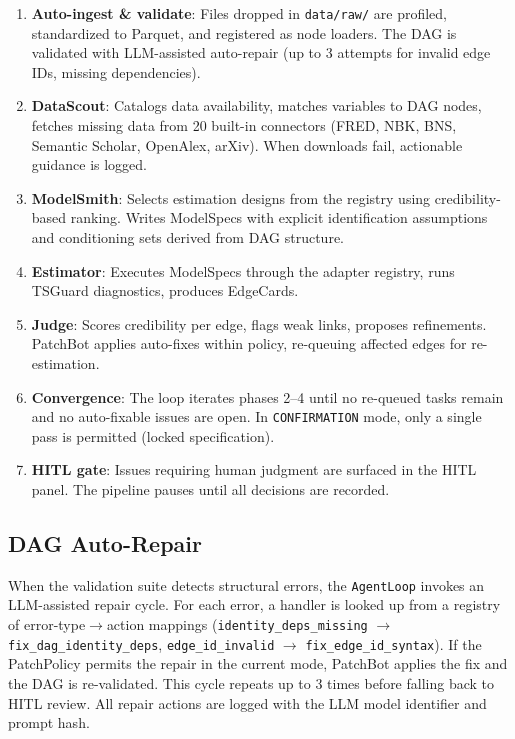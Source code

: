 \documentclass{article}
\begin{document}
\begin{enumerate}[leftmargin=*, itemsep=1pt]
    \item[\textbf{0.}] \textbf{Auto-ingest \& validate}: Files dropped in \texttt{data/raw/} are profiled, standardized to Parquet, and registered as node loaders. The DAG is validated with LLM-assisted auto-repair (up to 3 attempts for invalid edge IDs, missing dependencies).

    \item[\textbf{1.}] \textbf{DataScout}: Catalogs data availability, matches variables to DAG nodes, fetches missing data from 20 built-in connectors (FRED, NBK, BNS, Semantic Scholar, OpenAlex, arXiv). When downloads fail, actionable guidance is logged.

    \item[\textbf{2.}] \textbf{ModelSmith}: Selects estimation designs from the registry using credibility-based ranking. Writes ModelSpecs with explicit identification assumptions and conditioning sets derived from DAG structure.

    \item[\textbf{3.}] \textbf{Estimator}: Executes ModelSpecs through the adapter registry, runs TSGuard diagnostics, produces EdgeCards.

    \item[\textbf{4.}] \textbf{Judge}: Scores credibility per edge, flags weak links, proposes refinements. PatchBot applies auto-fixes within policy, re-queuing affected edges for re-estimation.

    \item[\textbf{5.}] \textbf{Convergence}: The loop iterates phases 2--4 until no re-queued tasks remain and no auto-fixable issues are open. In \texttt{CONFIRMATION} mode, only a single pass is permitted (locked specification).

    \item[\textbf{6.}] \textbf{HITL gate}: Issues requiring human judgment are surfaced in the HITL panel. The pipeline pauses until all decisions are recorded.
\end{enumerate}

\subsection{DAG Auto-Repair}

When the validation suite detects structural errors, the \texttt{AgentLoop} invokes an LLM-assisted repair cycle. For each error, a handler is looked up from a registry of error-type$\to$action mappings (\eg \texttt{identity\_deps\_missing} $\to$ \texttt{fix\_dag\_identity\_deps}, \texttt{edge\_id\_invalid} $\to$ \texttt{fix\_edge\_id\_syntax}). If the PatchPolicy permits the repair in the current mode, PatchBot applies the fix and the DAG is re-validated. This cycle repeats up to 3 times before falling back to HITL review. All repair actions are logged with the LLM model identifier and prompt hash.
\end{document}
